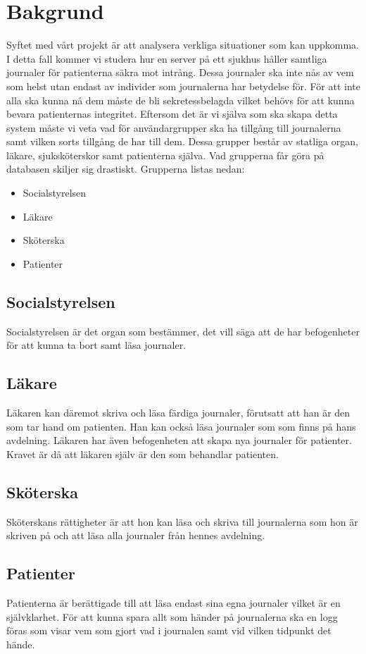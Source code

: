 \section{Bakgrund}

Syftet med vårt projekt är att analysera verkliga situationer som kan uppkomma. I detta fall kommer vi studera hur en server på ett sjukhus håller samtliga journaler för patienterna säkra mot intrång. Dessa journaler ska inte nås av vem som helst utan endast av individer som journalerna har betydelse för. För att inte alla ska kunna nå dem måste de bli sekretessbelagda vilket behövs för att kunna bevara patienternas integritet. Eftersom det är vi själva som ska skapa detta system måste vi veta vad för användargrupper ska ha tillgång till journalerna samt vilken sorts tillgång de har till dem. Dessa grupper består av statliga organ, läkare, sjuksköterskor samt patienterna själva. Vad grupperna får göra på databasen skiljer sig drastiskt. Grupperna listas nedan:

\begin{itemize}
\item{Socialstyrelsen}
\item{Läkare}
\item{Sköterska}
\item{Patienter}
\end{itemize} 


\subsection{Socialstyrelsen}
Socialstyrelsen är det organ som bestämmer, det vill säga att de har befogenheter för att kunna ta bort samt läsa journaler. 

\subsection{Läkare}
Läkaren kan däremot skriva och läsa färdiga journaler, förutsatt att han är den som tar hand om patienten. Han kan också läsa journaler som som finns på hans avdelning. Läkaren har även befogenheten att skapa nya journaler för patienter. Kravet är då att läkaren själv är den som behandlar patienten.

\subsection{Sköterska}
Sköterskans rättigheter är att hon kan läsa och skriva till journalerna som hon är skriven på och att läsa alla journaler från hennes avdelning.

\subsection{Patienter}
Patienterna är berättigade till att läsa endast sina egna journaler vilket är en självklarhet.
För att kunna spara allt som händer på journalerna ska en logg föras som visar vem som gjort vad i journalen samt vid vilken tidpunkt det hände.
